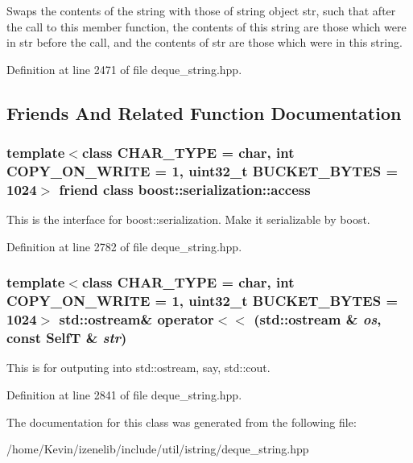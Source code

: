 Swaps the contents of the string with those of string object str, such that after the call to this member function, the contents of this string are those which were in str before the call, and the contents of str are those which were in this string. 

Definition at line 2471 of file deque\_\-string.hpp.

\subsection{Friends And Related Function Documentation}
\hypertarget{classdeque__string_c98d07dd8f7b70e16ccb9a01abf56b9c}{
\subsubsection[{boost::serialization::access}]{\setlength{\rightskip}{0pt plus 5cm}template$<$class CHAR\_\-TYPE  = char, int COPY\_\-ON\_\-WRITE = 1, uint32\_\-t BUCKET\_\-BYTES = 1024$>$ friend class boost::serialization::access}}
\label{classdeque__string_c98d07dd8f7b70e16ccb9a01abf56b9c}


This is the interface for boost::serialization. Make it serializable by boost. 

Definition at line 2782 of file deque\_\-string.hpp.\hypertarget{classdeque__string_9f77d965eac7a717e9124196d686e094}{
\subsubsection[{operator$<$$<$}]{\setlength{\rightskip}{0pt plus 5cm}template$<$class CHAR\_\-TYPE  = char, int COPY\_\-ON\_\-WRITE = 1, uint32\_\-t BUCKET\_\-BYTES = 1024$>$ std::ostream\& operator$<$$<$ (std::ostream \& {\em os}, \/  const {\bf SelfT} \& {\em str})}}
\label{classdeque__string_9f77d965eac7a717e9124196d686e094}


This is for outputing into std::ostream, say, std::cout. 

Definition at line 2841 of file deque\_\-string.hpp.

The documentation for this class was generated from the following file:\begin{CompactItemize}
\item 
/home/Kevin/izenelib/include/util/istring/deque\_\-string.hpp\end{CompactItemize}
